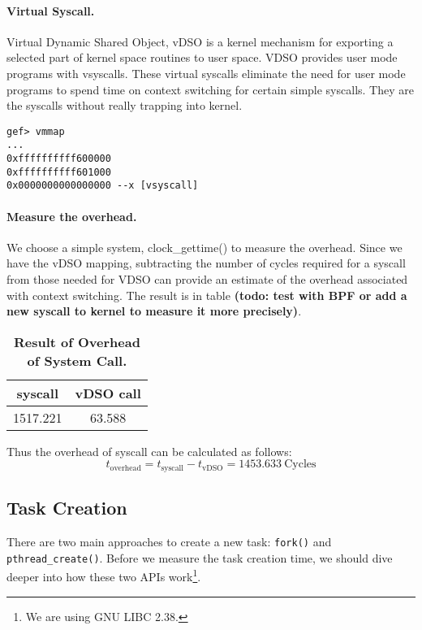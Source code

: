 \paragraph{Virtual Syscall.} Virtual Dynamic Shared Object, vDSO is a kernel mechanism for exporting a selected part of kernel space routines to user space. VDSO provides user mode programs with vsyscalls. These virtual syscalls eliminate the need for user mode programs to spend time on context switching for certain simple syscalls. They are the syscalls without really trapping into kernel.

\begin{lstlisting}[caption=vDSO mapping]
gef> vmmap
...
0xffffffffff600000 
0xffffffffff601000 
0x0000000000000000 --x [vsyscall]
\end{lstlisting}

\paragraph{Measure the overhead.} We choose a simple system, clock\_gettime() to measure the overhead. Since we have the vDSO mapping, subtracting the number of cycles required for a syscall from those needed for VDSO can provide an estimate of the overhead associated with context switching. The result is in table \textbf{(todo: test with BPF or add a new syscall to kernel to measure it more precisely)}.
\begin{table}[h]
	\centering
	\begin{tabular}{c|c}
		\hline
		\bf{syscall} & \bf{vDSO call} \\ \hline
        1517.221 & 63.588 \\ \hline
	\end{tabular}
	\caption{\textbf{Result of Overhead of System Call.}}
	\label{table:procedure-test}
\end{table}
Thus the overhead of syscall can be calculated as follows:
\begin{equation}
    t_{\text{overhead}}=t_{\text{syscall}}-t_{\text{vDSO}}=1453.633\ \text{Cycles}
\end{equation}

\subsection{Task Creation} There are two main approaches to create a new task: \texttt{fork()} and \texttt{pthread\_create()}. Before we measure the task creation time, we should dive deeper into how these two APIs work\footnote{We are using GNU LIBC 2.38.}.

